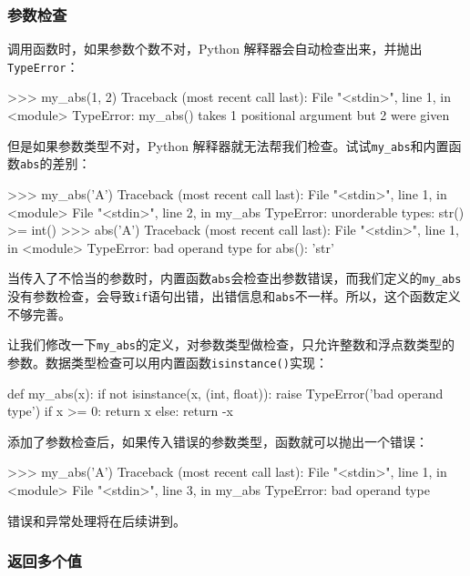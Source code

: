 \hypertarget{ux53c2ux6570ux68c0ux67e5}{%
\subsubsection{参数检查}\label{ux53c2ux6570ux68c0ux67e5}}

调用函数时，如果参数个数不对，Python
解释器会自动检查出来，并抛出\texttt{TypeError}：

\begin{pythoncode}
>>> my_abs(1, 2)
Traceback (most recent call last):
  File "<stdin>", line 1, in <module>
TypeError: my_abs() takes 1 positional argument but 2 were given
\end{pythoncode}

但是如果参数类型不对，Python
解释器就无法帮我们检查。试试\texttt{my\_abs}和内置函数\texttt{abs}的差别：

\begin{pythoncode}
>>> my_abs('A')
Traceback (most recent call last):
  File "<stdin>", line 1, in <module>
  File "<stdin>", line 2, in my_abs
TypeError: unorderable types: str() >= int()
>>> abs('A')
Traceback (most recent call last):
  File "<stdin>", line 1, in <module>
TypeError: bad operand type for abs(): 'str'
\end{pythoncode}

当传入了不恰当的参数时，内置函数\texttt{abs}会检查出参数错误，而我们定义的\texttt{my\_abs}没有参数检查，会导致\texttt{if}语句出错，出错信息和\texttt{abs}不一样。所以，这个函数定义不够完善。

让我们修改一下\texttt{my\_abs}的定义，对参数类型做检查，只允许整数和浮点数类型的参数。数据类型检查可以用内置函数\texttt{isinstance()}实现：

\begin{pythoncode}
def my_abs(x):
    if not isinstance(x, (int, float)):
        raise TypeError('bad operand type')
    if x >= 0:
        return x
    else:
        return -x
\end{pythoncode}

添加了参数检查后，如果传入错误的参数类型，函数就可以抛出一个错误：

\begin{pythoncode}
>>> my_abs('A')
Traceback (most recent call last):
  File "<stdin>", line 1, in <module>
  File "<stdin>", line 3, in my_abs
TypeError: bad operand type
\end{pythoncode}

错误和异常处理将在后续讲到。

\hypertarget{ux8fd4ux56deux591aux4e2aux503c}{%
\subsubsection{返回多个值}\label{ux8fd4ux56deux591aux4e2aux503c}}

